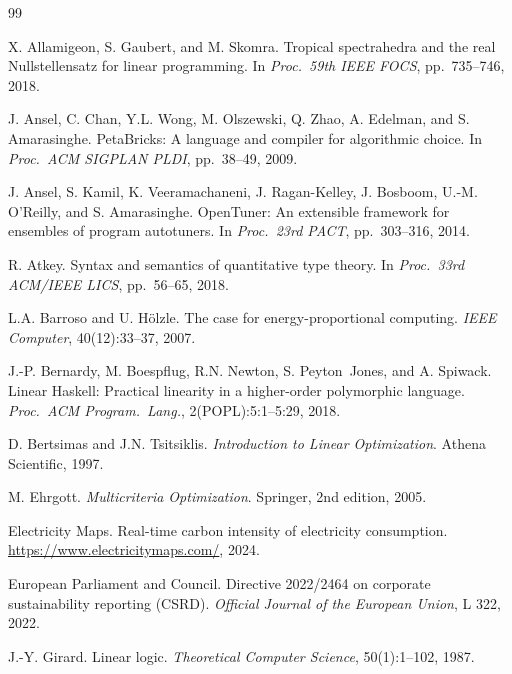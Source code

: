\documentclass[11pt,a4paper]{article}
\begin{document}
\begin{thebibliography}{99}

X. Allamigeon, S. Gaubert, and M. Skomra.
\newblock Tropical spectrahedra and the real Nullstellensatz for linear
  programming.
\newblock In \emph{Proc.\ 59th IEEE FOCS}, pp.\ 735--746, 2018.

J. Ansel, C. Chan, Y.L. Wong, M. Olszewski, Q. Zhao, A. Edelman, and
  S. Amarasinghe.
\newblock PetaBricks: A language and compiler for algorithmic choice.
\newblock In \emph{Proc.\ ACM SIGPLAN PLDI}, pp.\ 38--49, 2009.

J. Ansel, S. Kamil, K. Veeramachaneni, J. Ragan-Kelley, J. Bosboom,
  U.-M. O'Reilly, and S. Amarasinghe.
\newblock OpenTuner: An extensible framework for ensembles of program
  autotuners.
\newblock In \emph{Proc.\ 23rd PACT}, pp.\ 303--316, 2014.

R. Atkey.
\newblock Syntax and semantics of quantitative type theory.
\newblock In \emph{Proc.\ 33rd ACM/IEEE LICS}, pp.\ 56--65, 2018.

L.A. Barroso and U. H\"{o}lzle.
\newblock The case for energy-proportional computing.
\newblock \emph{IEEE Computer}, 40(12):33--37, 2007.

J.-P. Bernardy, M. Boespflug, R.N. Newton, S. Peyton~Jones, and A. Spiwack.
\newblock Linear Haskell: Practical linearity in a higher-order polymorphic
  language.
\newblock \emph{Proc.\ ACM Program.\ Lang.}, 2(POPL):5:1--5:29, 2018.

D. Bertsimas and J.N. Tsitsiklis.
\newblock \emph{Introduction to Linear Optimization}.
\newblock Athena Scientific, 1997.

M. Ehrgott.
\newblock \emph{Multicriteria Optimization}.
\newblock Springer, 2nd edition, 2005.

Electricity Maps.
\newblock Real-time carbon intensity of electricity consumption.
\newblock \url{https://www.electricitymaps.com/}, 2024.

European Parliament and Council.
\newblock Directive 2022/2464 on corporate sustainability reporting (CSRD).
\newblock \emph{Official Journal of the European Union}, L 322, 2022.

J.-Y. Girard.
\newblock Linear logic.
\newblock \emph{Theoretical Computer Science}, 50(1):1--102, 1987.


\end{thebibliography}
\end{document}
